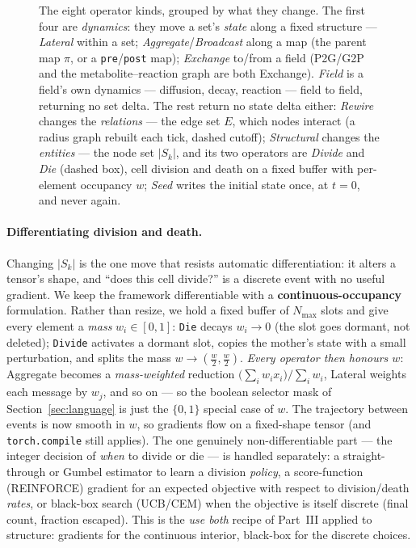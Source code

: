 \documentclass[11pt]{article}
\newcommand{\code}[1]{\texttt{#1}}
\begin{document}
\begin{figure}[h]
\caption{The eight operator kinds, grouped by what they change. The first four are
\emph{dynamics}: they move a set's \emph{state} along a fixed structure --- \emph{Lateral}
within a set; \emph{Aggregate}/\emph{Broadcast} along a map (the parent map $\pi$, or a \code{pre}/\code{post} map);
\emph{Exchange} to/from a field (P2G/G2P and the metabolite--reaction graph are
both Exchange). \emph{Field} is a field's own dynamics --- diffusion, decay, reaction ---
field to field, returning no set delta. The rest return no state delta either: \emph{Rewire}
changes the \emph{relations} --- the edge set $E$, which nodes interact (a radius graph rebuilt
each tick, dashed cutoff); \emph{Structural} changes the \emph{entities} --- the node set
$|S_k|$, and its two operators are \emph{Divide} and \emph{Die} (dashed box), cell division and
death on a fixed buffer with per-element occupancy $w$; \emph{Seed} writes the initial state
once, at $t=0$, and never again.}
\label{fig:ops}
\end{figure}

\paragraph{Differentiating division and death.} Changing $|S_k|$ is the one move
that resists automatic differentiation: it alters a tensor's shape, and ``does
this cell divide?'' is a discrete event with no useful gradient. We keep the
framework differentiable with a \textbf{continuous-occupancy} formulation. Rather
than resize, we hold a fixed buffer of $N_{\max}$ slots and give every element a
\emph{mass} $w_i\in[0,1]$: \code{Die} decays $w_i\!\to\!0$ (the slot goes
dormant, not deleted); \code{Divide} activates a dormant slot, copies the
mother's state with a small perturbation, and splits the mass
$w\!\to\!(\tfrac{w}{2},\tfrac{w}{2})$. \emph{Every operator then honours $w$}:
Aggregate becomes a \emph{mass-weighted} reduction
$\big(\sum_i w_i x_i\big)/\sum_i w_i$, Lateral weights each message by $w_j$, and
so on --- so the boolean selector mask of Section~\ref{sec:language} is just the
$\{0,1\}$ special case of $w$. The trajectory between events is now smooth in
$w$, so gradients flow on a fixed-shape tensor (and \code{torch.compile} still
applies). The one genuinely non-differentiable part --- the integer decision of
\emph{when} to divide or die --- is handled separately: a straight-through or
Gumbel estimator to learn a division \emph{policy}, a score-function (REINFORCE)
gradient for an expected objective with respect to division/death \emph{rates},
or black-box search (UCB/CEM) when the objective is itself discrete (final count,
fraction escaped). This is the \emph{use both} recipe of Part~III applied to
structure: gradients for the continuous interior, black-box for the discrete
choices.
\end{document}
